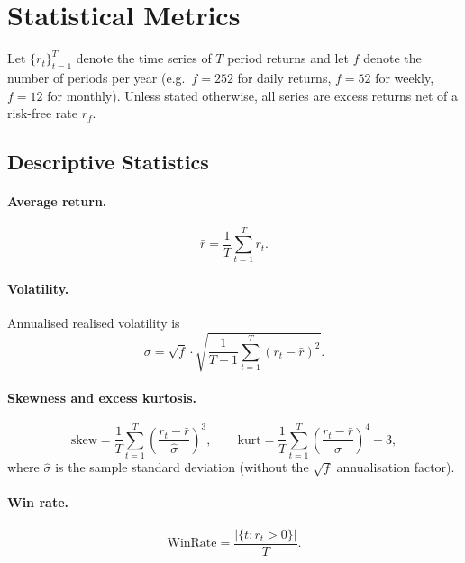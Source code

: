 \documentclass[11pt,a4paper]{article}
\begin{document}
\section{Statistical Metrics}
\label{sec:stats}

Let $\{r_t\}_{t=1}^{T}$ denote the time series of $T$ period returns and let
$f$ denote the number of periods per year (e.g.\ $f = 252$ for daily returns,
$f = 52$ for weekly, $f = 12$ for monthly).  Unless stated otherwise, all
series are excess returns net of a risk-free rate $r_f$.

\subsection{Descriptive Statistics}

\paragraph{Average return.}
\begin{equation}
  \bar{r} = \frac{1}{T} \sum_{t=1}^{T} r_t.
\end{equation}

\paragraph{Volatility.}
Annualised realised volatility is
\begin{equation}
  \sigma = \sqrt{f} \cdot \sqrt{\frac{1}{T-1} \sum_{t=1}^{T}(r_t - \bar{r})^2}.
\end{equation}

\paragraph{Skewness and excess kurtosis.}
\begin{equation}
  \text{skew} = \frac{1}{T}\sum_{t=1}^{T}\left(\frac{r_t - \bar{r}}{\hat\sigma}\right)^3,
  \qquad
  \text{kurt} = \frac{1}{T}\sum_{t=1}^{T}\left(\frac{r_t - \bar{r}}{\hat\sigma}\right)^4 - 3,
\end{equation}
where $\hat\sigma$ is the sample standard deviation (without the $\sqrt{f}$
annualisation factor).

\paragraph{Win rate.}
\begin{equation}
  \text{WinRate} = \frac{|\{t : r_t > 0\}|}{T}.
\end{equation}
\end{document}

